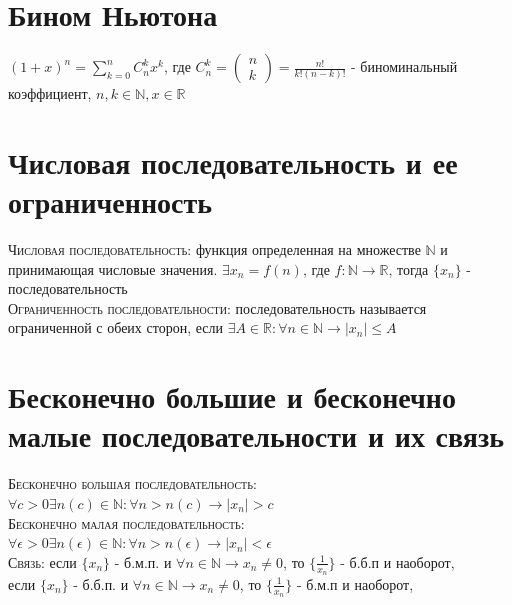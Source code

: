 \documentclass[14pt]{article}
\begin{document}
    \section{Бином Ньютона}
        $(1+x)^n = \sum^n_{k=0} C^k_n x^k$, где $C^k_n = 
        \begin{pmatrix}
            n \\ k
        \end{pmatrix} 
        = \frac{n!}{k!(n-k)!}$ - биноминальный коэффициент, $n,k \in \mathbb{N}, x \in \mathbb{R}$

    \section{Числовая последовательность и ее ограниченность}
        \textsc{Числовая последовательность:} функция определенная на множестве $\mathbb{N}$ и принимающая числовые значения. $\exists x_n = f(n)$, где $f:\mathbb{N} \rightarrow  \mathbb{R}$, тогда $\{x_n \}$ - последовательность \\
        \textsc{Ограниченность последовательности: } последовательность называется ограниченной с обеих сторон, если $\exists A \in \mathbb{R}: \forall n \in \mathbb{N} \rightarrow |x_n| \leqslant A$

    \section{Бесконечно большие и бесконечно малые последовательности и их связь}
        \textsc{Бесконечно большая последовательность: } $\forall c > 0 \exists n(c) \in \mathbb{N} : \forall n > n(c) \rightarrow |x_n| > c$ \\ 
        \textsc{Бесконечно малая последовательность: } $\forall \epsilon > 0 \exists n(\epsilon) \in \mathbb{N} : \forall n > n(\epsilon) \rightarrow |x_n| < \epsilon$ \\
        \textsc{Связь:} если $\{x_n\}$ - б.м.п. и $\forall n \in \mathbb{N} \rightarrow x_n \ne 0 $, то $\{\frac{1}{x_n}\}$ - б.б.п и наоборот, \\ если $\{x_n\}$ - б.б.п. и $\forall n \in \mathbb{N} \rightarrow x_n \ne 0 $, то $\{\frac{1}{x_n}\}$ - б.м.п и наоборот,
    
\end{document}
